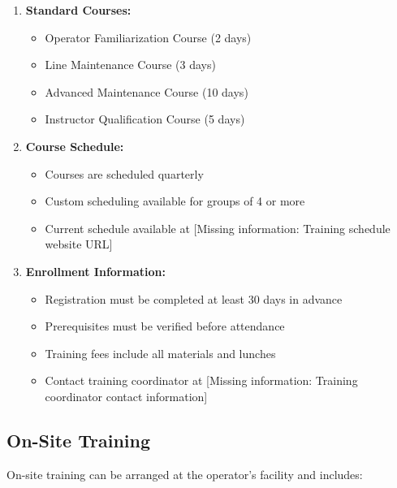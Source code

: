 \documentclass[12pt,a4paper,twoside,openright]{book}
\begin{document}
\begin{enumerate}
    \item \textbf{Standard Courses:}
    \begin{itemize}
        \item Operator Familiarization Course (2 days)
        \item Line Maintenance Course (3 days)
        \item Advanced Maintenance Course (10 days)
        \item Instructor Qualification Course (5 days)
    \end{itemize}
    
    \item \textbf{Course Schedule:}
    \begin{itemize}
        \item Courses are scheduled quarterly
        \item Custom scheduling available for groups of 4 or more
        \item Current schedule available at {\color{missingred}[Missing information: Training schedule website URL]}
    \end{itemize}
    
    \item \textbf{Enrollment Information:}
    \begin{itemize}
        \item Registration must be completed at least 30 days in advance
        \item Prerequisites must be verified before attendance
        \item Training fees include all materials and lunches
        \item Contact training coordinator at {\color{missingred}[Missing information: Training coordinator contact information]}
    \end{itemize}
\end{enumerate}

\subsection{On-Site Training}

On-site training can be arranged at the operator's facility and includes:
\end{document}
